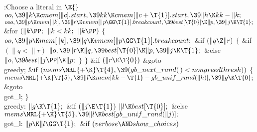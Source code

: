 \B{}:Choose a literal  in \X${}\E{}$\6
$\\{oo},\39\|k\K\\{cmem}[\|c].\\{start},\39\\{kk}\K\\{cmem}[\|c+\T{1}].%
\\{start},\39\|h\K\\{kk}-\|k;{}$\6
${}\\{ooo},\39\|p\K\\{mem}[\|k],\39\|r\K\\{vmem}[\|p\GG\T{1}].\\{breakcount},%
\39\\{best}[\T{0}]\K\|p,\39\|j\K\T{1};{}$\6
\&{for} ${}(\|k\PP;{}$ ${}\|k<\\{kk};{}$ ${}\|k\PP){}$\5
${}\{{}$\1\6
${}\\{oo},\39\|p\K\\{mem}[\|k],\39\|q\K\\{vmem}[\|p\GG\T{1}].\\{breakcount};{}$%
\6
\&{if} ${}(\|q\Z\|r){}$\5
${}\{{}$\1\6
\&{if} ${}(\|q<\|r){}$\1\5
${}\|o,\39\|r\K\|q,\39\\{best}[\T{0}]\K\|p,\39\|j\K\T{1};{}$\2\6
\&{else}\1\5
${}\|o,\39\\{best}[\|j\PP]\K\|p;{}$\2\6
\4${}\}{}$\2\6
\4${}\}{}$\2\6
\&{if} ${}(\|r\E\T{0}){}$\1\5
\&{goto} \\{greedy};\2\6
\&{if} ${}(\\{mems}\MRL{+{\K}}\T{4},\39(\\{gb\_next\_rand}(\,)<%
\\{nongreedthresh})){}$\5
${}\{{}$\1\6
${}\\{mems}\MRL{+{\K}}\T{5},\39\|l\K\\{mem}[\\{kk}-\T{1}-\\{gb\_unif\_rand}(%
\|h)],\39\|g\K\T{0};{}$\6
\&{goto} \\{got\_l};\6
\4${}\}{}$\2\6
\4\\{greedy}:\5
${}\|g\K\T{1};{}$\6
\&{if} ${}(\|j\E\T{1}){}$\1\5
${}\|l\K\\{best}[\T{0}];{}$\2\6
\&{else}\1\5
${}\\{mems}\MRL{+{\K}}\T{5},\39\|l\K\\{best}[\\{gb\_unif\_rand}(\|j)];{}$\2\6
\4\\{got\_l}:\5
${}\|p\K\|l\GG\T{1};{}$\6
\&{if} ${}(\\{verbose}\AND\\{show\_choices}){}$\5
